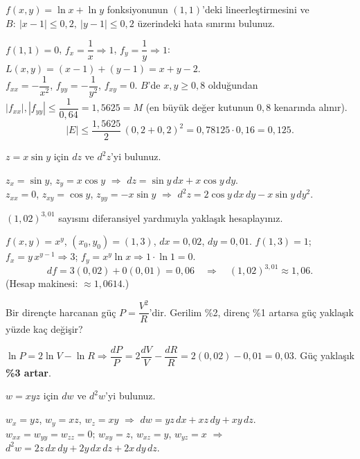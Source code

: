 \begin{soru}
$f(x,y)=\ln x+\ln y$ fonksiyonunun $(1,1)$'deki lineerleştirmesini ve $B:\ |x-1|\le0{,}2,\ |y-1|\le0{,}2$ üzerindeki
hata sınırını bulunuz.
\end{soru}
\begin{cevap}
$f(1,1)=0$, $f_x=\dfrac1x\Rightarrow1$, $f_y=\dfrac1y\Rightarrow1$: \ $L(x,y)=(x-1)+(y-1)=x+y-2$.\\
$f_{xx}=-\dfrac1{x^2}$, $f_{yy}=-\dfrac1{y^2}$, $f_{xy}=0$. $B$'de $x,y\ge0{,}8$ olduğundan
$|f_{xx}|,|f_{yy}|\le\dfrac1{0{,}64}=1{,}5625=M$ (en büyük değer kutunun $0{,}8$ kenarında alınır).
\[ |E|\le\frac{1{,}5625}{2}\,(0{,}2+0{,}2)^2=0{,}78125\cdot0{,}16=0{,}125 . \]
\end{cevap}

\begin{soru}
$z=x\sin y$ için $dz$ ve $d^2z$'yi bulunuz.
\end{soru}
\begin{cevap}
$z_x=\sin y$, $z_y=x\cos y$ $\Rightarrow$ $dz=\sin y\,dx+x\cos y\,dy$.\\
$z_{xx}=0$, $z_{xy}=\cos y$, $z_{yy}=-x\sin y$ $\Rightarrow$ $d^2z=2\cos y\,dx\,dy-x\sin y\,dy^2$.
\end{cevap}

\begin{soru}
$(1{,}02)^{3{,}01}$ sayısını diferansiyel yardımıyla yaklaşık hesaplayınız.
\end{soru}
\begin{cevap}
$f(x,y)=x^y$, $(x_0,y_0)=(1,3)$, $dx=0{,}02$, $dy=0{,}01$. $f(1,3)=1$;
$f_x=y\,x^{y-1}\Rightarrow3$; $f_y=x^y\ln x\Rightarrow1\cdot\ln1=0$.
\[ df=3(0{,}02)+0(0{,}01)=0{,}06\quad\Rightarrow\quad(1{,}02)^{3{,}01}\approx1{,}06 . \]
(Hesap makinesi: $\approx1{,}0614$.)
\end{cevap}

\begin{soru}
Bir dirençte harcanan güç $P=\dfrac{V^2}{R}$'dir. Gerilim \%2, direnç \%1 artarsa güç yaklaşık yüzde kaç değişir?
\end{soru}
\begin{cevap}
$\ln P=2\ln V-\ln R\Rightarrow\dfrac{dP}{P}=2\dfrac{dV}{V}-\dfrac{dR}{R}=2(0{,}02)-0{,}01=0{,}03$.
Güç yaklaşık \textbf{\%3 artar}.
\end{cevap}

\begin{soru}
$w=xyz$ için $dw$ ve $d^2w$'yi bulunuz.
\end{soru}
\begin{cevap}
$w_x=yz$, $w_y=xz$, $w_z=xy$ $\Rightarrow$ $dw=yz\,dx+xz\,dy+xy\,dz$.\\
$w_{xx}=w_{yy}=w_{zz}=0$; $w_{xy}=z$, $w_{xz}=y$, $w_{yz}=x$ $\Rightarrow$
$d^2w=2z\,dx\,dy+2y\,dx\,dz+2x\,dy\,dz$.
\end{cevap}
